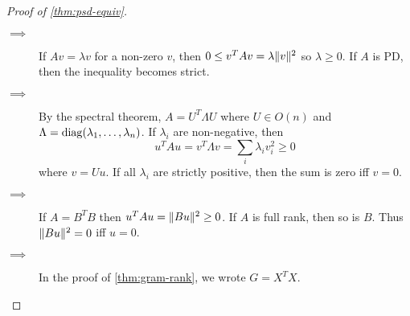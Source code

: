 \begin{proof}[Proof of \cref{thm:psd-equiv}] \leavevmode
    \begin{description}
        \item[ $\implies$ ]
            If $Av = \lambda v$ for a non-zero $v$,
            then $0 \le v^T A v = \lambda \lVert v\rVert^2$ so $\lambda \ge 0$.
            If $A$ is PD, then the inequality becomes strict.
        \item[ $\implies$ ]
            By the spectral theorem, $A = U^T \Lambda U$ where
            $U \in O(n)$ and $\Lambda = \operatorname{diag}(\lambda_1, \dots, \lambda_n)$.
            If $\lambda_i$ are non-negative, then \[
                u^T A u = v^T \Lambda v = \sum_i \lambda_i v_i^2 \ge 0
            \] where $v = U u$.
            If all $\lambda_i$ are strictly positive, then the sum is
            zero iff $v = 0$.
        \item[ $\implies$ ]
            If $A = B^T B$ then $u^T A u = \lVert B u\rVert^2 \ge 0$.
            If $A$ is full rank, then so is $B$.
            Thus $\lVert B u\rVert^2 = 0$ iff $u = 0$.
        \item[ $\implies$ ]
            In the proof of \cref{thm:gram-rank}, we wrote $G = X^T X$.


\end{description}
\end{proof}
